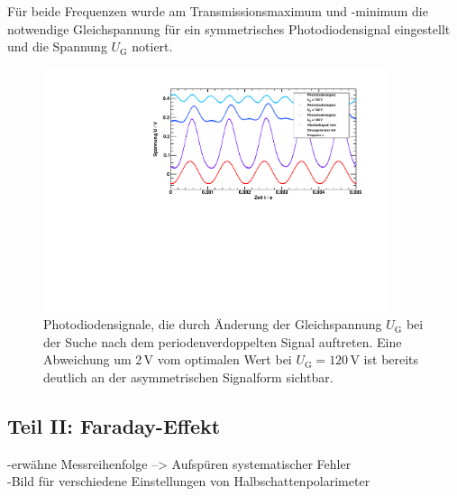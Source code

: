 Für beide Frequenzen wurde am Transmissionsmaximum und -minimum
die notwendige Gleichspannung für ein symmetrisches
Photodiodensignal eingestellt und die Spannung $U_{\text{G}}$ notiert.

\begin{figure}[H]
\begin{center}
  \includegraphics[width=0.9\textwidth]{../img/pockdurchf.pdf}
  \caption{Photodiodensignale, die durch Änderung der Gleichspannung $U_\text{G}$
  bei der Suche nach dem periodenverdoppelten Signal auftreten.
  Eine Abweichung um 2\,V vom optimalen Wert bei $U_\text{G}=120$\,V ist bereits deutlich 
  an der asymmetrischen Signalform sichtbar.}
  \label{img:pockdurchf}
\end{center}
\end{figure}


\subsection{Teil II: Faraday-Effekt}
-erwähne Messreihenfolge --> Aufspüren systematischer Fehler \\
-Bild für verschiedene Einstellungen von Halbschattenpolarimeter